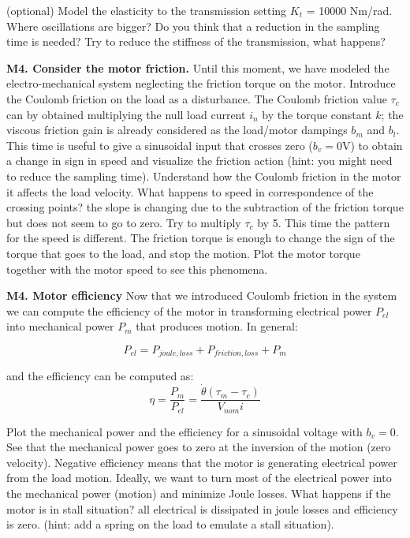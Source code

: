 \documentclass[11pt]{article}
\begin{document}
(optional) Model the  elasticity to the transmission setting $K_t$ = 10000 Nm/rad. Where oscillations are bigger? Do you think that a reduction in the sampling time is needed? Try to reduce the stiffness of the transmission, what happens?
%
%
\par
\textbf{M4. Consider the motor friction.} 
Until this moment, we have modeled the electro-mechanical system neglecting the friction torque on the motor. 
Introduce the Coulomb friction on the load as a disturbance. 
The Coulomb friction value $\tau_c$ can by obtained multiplying the null load current $i_n$ by the torque constant $k$; the viscous friction gain is already considered as the load/motor dampings $b_m$ and $b_l$. This time is useful to give a sinusoidal input that crosses zero ($b_v = 0 \mathrm{V}$)
to obtain a  change in sign in speed  and visualize the friction action (hint: you might need to reduce the sampling time). Understand how the Coulomb friction in the motor it affects the load velocity. 
What happens to speed in correspondence of the crossing points? the slope  is 
changing due to the subtraction of the friction torque but does not seem to go to zero. 
Try to multiply $\tau_c$ by 5. This time the pattern for the speed is different. 
The friction torque is enough to change the sign of the torque that goes to the load, 
and stop the motion. Plot the motor torque together with the motor speed to see this phenomena.


\textbf{M4. Motor efficiency}
Now that we introduced Coulomb friction in the system we can compute the efficiency of the motor in 
transforming electrical power $P_{el}$  into mechanical power $P_m$ that produces motion. 
In general:

\begin{equation}
P_{el} = P_{joule,loss} + P_{friction, loss} +   P_m
\end{equation}

and the efficiency can be computed as:
\begin{equation}
\eta = \frac{P_{m}}{P_{el}} =  \frac{\dot{\theta}(\tau_m - \tau_c)} {V_{nom} i }
\end{equation}

Plot the mechanical power and the efficiency for a sinusoidal voltage with $b_v = 0$. 
See that the mechanical power goes to zero at the inversion of the motion (zero velocity).
Negative efficiency means that the motor is generating electrical power from the load motion.
Ideally, we want to turn most of the electrical power into the mechanical power (motion) and minimize Joule losses. 
What happens if the motor is in stall situation? all electrical is dissipated in joule losses and efficiency is zero. 
(hint: add a spring on the load to emulate a stall situation).
\end{document}
